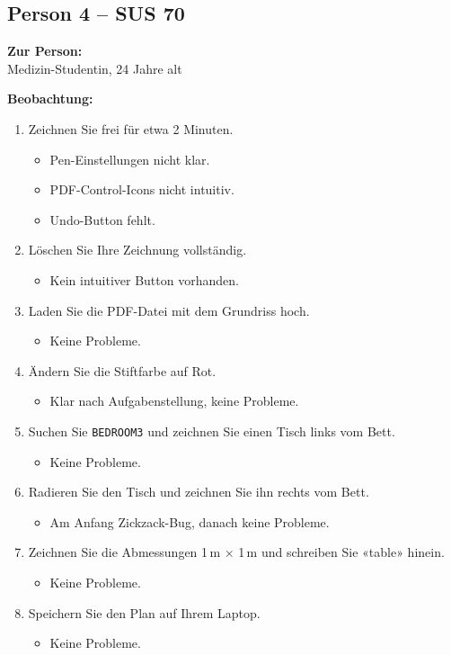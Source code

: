 \subsection{Person 4 – SUS 70}  
\textbf{Zur Person:}\\
Medizin-Studentin, 24 Jahre alt 

\textbf{Beobachtung:}  
\begin{enumerate}
    \item Zeichnen Sie frei für etwa 2 Minuten.
    \begin{itemize}
        \item Pen-Einstellungen nicht klar.
        \item PDF-Control-Icons nicht intuitiv.
        \item Undo-Button fehlt.
    \end{itemize}

    \item Löschen Sie Ihre Zeichnung vollständig.
    \begin{itemize}
        \item Kein intuitiver Button vorhanden.
    \end{itemize}

    \item Laden Sie die PDF-Datei mit dem Grundriss hoch.
    \begin{itemize}
        \item Keine Probleme.
    \end{itemize}

    \item Ändern Sie die Stiftfarbe auf Rot.
    \begin{itemize}
        \item Klar nach Aufgabenstellung, keine Probleme.
    \end{itemize}

    \item Suchen Sie \texttt{BEDROOM3} und zeichnen Sie einen Tisch links vom Bett.
    \begin{itemize}
        \item Keine Probleme.
    \end{itemize}

    \item Radieren Sie den Tisch und zeichnen Sie ihn rechts vom Bett.
    \begin{itemize}
        \item Am Anfang Zickzack-Bug, danach keine Probleme.
    \end{itemize}

    \item Zeichnen Sie die Abmessungen 1\,m $\times$ 1\,m und schreiben Sie «table» hinein.
    \begin{itemize}
        \item Keine Probleme.
    \end{itemize}

    \item Speichern Sie den Plan auf Ihrem Laptop.
    \begin{itemize}
        \item Keine Probleme.
    \end{itemize}
\end{enumerate}

